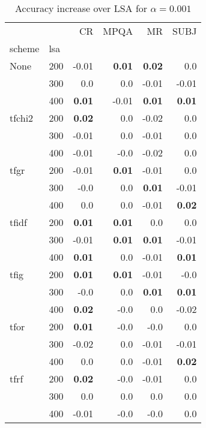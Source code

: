 \begin{table}[h]
\begin{center}

\begin{tabular}{ll|rrrr}
\toprule
   &   &   CR &  MPQA &   MR &  SUBJ \\
scheme & lsa &        &        &        &        \\
\midrule
None & 200 &     -0.01 & \textbf{0.01} & \textbf{0.02} &      0.0 \\
   & 300 &      0.0 &      0.0 &     -0.01 &     -0.01 \\
   & 400 & \textbf{0.01} &     -0.01 & \textbf{0.01} & \textbf{0.01} \\
tfchi2 & 200 & \textbf{0.02} &      0.0 &     -0.02 &      0.0 \\
   & 300 &     -0.01 &      0.0 &     -0.01 &      0.0 \\
   & 400 &     -0.01 &     -0.0 &     -0.02 &      0.0 \\
tfgr & 200 &     -0.01 & \textbf{0.01} &     -0.01 &      0.0 \\
   & 300 &     -0.0 &      0.0 & \textbf{0.01} &     -0.01 \\
   & 400 &      0.0 &      0.0 &     -0.01 & \textbf{0.02} \\
tfidf & 200 & \textbf{0.01} & \textbf{0.01} &      0.0 &      0.0 \\
   & 300 &     -0.01 & \textbf{0.01} & \textbf{0.01} &     -0.01 \\
   & 400 & \textbf{0.01} &      0.0 &     -0.01 & \textbf{0.01} \\
tfig & 200 & \textbf{0.01} & \textbf{0.01} &     -0.01 &     -0.0 \\
   & 300 &     -0.0 &      0.0 & \textbf{0.01} & \textbf{0.01} \\
   & 400 & \textbf{0.02} &     -0.0 &      0.0 &     -0.02 \\
tfor & 200 & \textbf{0.01} &     -0.0 &     -0.0 &      0.0 \\
   & 300 &     -0.02 &      0.0 &     -0.01 &     -0.01 \\
   & 400 &      0.0 &      0.0 &     -0.01 & \textbf{0.02} \\
tfrf & 200 & \textbf{0.02} &     -0.0 &     -0.01 &      0.0 \\
   & 300 &      0.0 &      0.0 &      0.0 &      0.0 \\
   & 400 &     -0.01 &     -0.0 &     -0.0 &      0.0 \\
\bottomrule
\end{tabular}

\caption[Accuracy increase over LSA for $\alpha=0.001$]{Accuracy increase over LSA for $\alpha=0.001$}
\label{tab:batch:results0.001}
\end{center}
\end{table}







